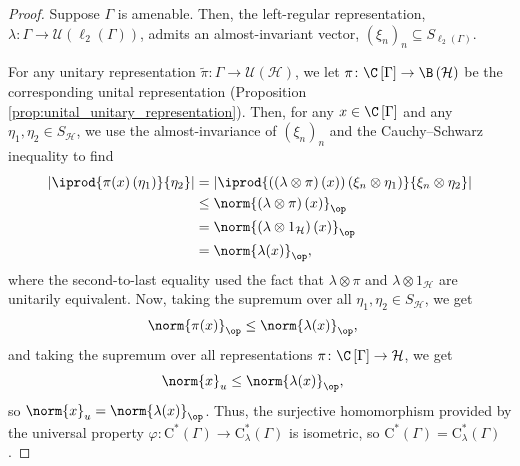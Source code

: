 \begin{proof}
  Suppose $\Gamma$ is amenable. Then, the left-regular representation, $\lambda\colon \Gamma\rightarrow \mathcal{U}\left( \ell_2\left( \Gamma \right) \right)$, admits an almost-invariant vector, $\left( \xi_n \right)_n\subseteq S_{\ell_2\left( \Gamma \right)}$.\newline

  For any unitary representation $\widetilde{\pi}\colon \Gamma\rightarrow \mathcal{U}\left( \mathcal{H} \right)$, we let $\pi\colon \C\left[ \Gamma \right]\rightarrow \B\left( \mathcal{H} \right)$ be the corresponding unital representation (Proposition \ref{prop:unital_unitary_representation}). Then, for any $x\in \C\left[ \Gamma \right]$ and any $\eta_1,\eta_2\in S_{\mathcal{H}}$, we use the almost-invariance of $\left( \xi_n \right)_n$ and the Cauchy--Schwarz inequality to find
  \begin{align*}
    \left\vert \iprod{\pi(x)\left( \eta_1 \right)}{\eta_2} \right\vert &= \left\vert \iprod{\left( \left( \lambda\otimes \pi \right)\left( x \right) \right)\left( \xi_n\otimes \eta_1 \right)}{\xi_n\otimes \eta_2} \right\vert\\
                                                                       &\leq \norm{\left( \lambda\otimes \pi \right)(x)}_{\op}\\
                                                                       &= \norm{\left( \lambda\otimes 1_{\mathcal{H}} \right)\left( x \right)}_{\op}\\
                                                                       &= \norm{\lambda(x)}_{\op},
  \end{align*}
  where the second-to-last equality used the fact that $\lambda\otimes \pi$ and $\lambda\otimes 1_{\mathcal{H}}$ are unitarily equivalent. Now, taking the supremum over all $\eta_1,\eta_2\in S_{\mathcal{H}}$, we get
  \begin{align*}
    \norm{\pi(x)}_{\op} &\leq \norm{\lambda(x)}_{\op},
  \end{align*}
  and taking the supremum over all representations $\pi\colon \C\left[ \Gamma \right]\rightarrow \mathcal{H}$, we get
  \begin{align*}
    \norm{x}_{u} &\leq \norm{\lambda(x)}_{\op},
  \end{align*}
  so $\norm{x}_u = \norm{\lambda(x)}_{\op}$. Thus, the surjective homomorphism provided by the universal property $\varphi\colon \mathrm{C}^{\ast}\left( \Gamma \right)\rightarrow \mathrm{C}^{\ast}_{\lambda}\left( \Gamma \right)$ is isometric, so $\mathrm{C}^{\ast}\left( \Gamma \right) = \mathrm{C}^{\ast}_{\lambda}\left( \Gamma \right)$.\newline


\end{proof}
